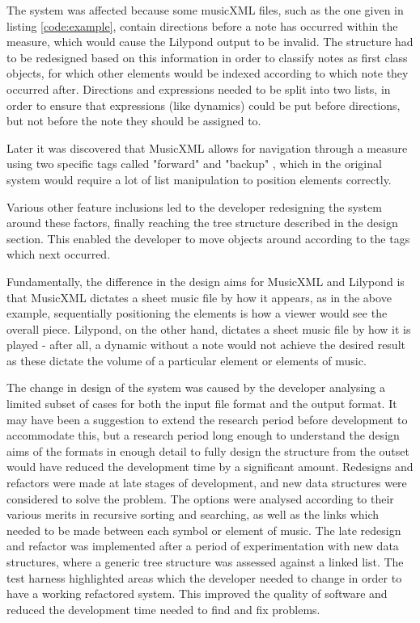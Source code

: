 The system was affected because some musicXML files, such as the one given in listing \ref{code:example}, contain directions before a note has occurred within the measure, which would cause the Lilypond output to be invalid. 
 The structure had to be redesigned based on this information in order to classify notes as first class objects, for which other elements would be indexed according to which note they occurred after. Directions and expressions needed to be split into two lists, in order to ensure that expressions (like dynamics) could be put before directions, but not before the note they should be assigned to.

Later it was discovered that MusicXML allows for navigation through a measure using two specific tags called "forward" and "backup" \parencite{forward}, which in the original system would require a lot of list manipulation to position elements correctly. 

Various other feature inclusions led to the developer redesigning the system around these factors, finally reaching the tree structure described in the design section. This enabled the developer to move objects around according to the tags which next occurred.

Fundamentally, the difference in the design aims for MusicXML and Lilypond is that MusicXML dictates a sheet music file by how it appears, as in the above example, sequentially positioning the elements is how a viewer would see the overall piece. Lilypond, on the other hand, dictates a sheet music file by how it is played - after all, a dynamic without a note would not achieve the desired result as these dictate the volume of a particular element or elements of music. 

 The change in design of the system was caused by the developer analysing a limited subset of cases for both the input file format and the output format. It may have been a suggestion to extend the research period before development to accommodate this, but a research period long enough to understand the design aims of the formats in enough detail to fully design the structure from the outset would have reduced the development time by a significant amount. Redesigns and refactors were made at late stages of development, and new data structures were considered to solve the problem. The options were analysed according to their various merits in recursive sorting and searching, as well as the links which needed to be made between each symbol or element of music. The late redesign and refactor was implemented after a period of experimentation with new data structures, where a generic tree structure was assessed against a linked list. The test harness highlighted areas which the developer needed to change in order to have a working refactored system. This improved the quality of software and reduced the development time needed to find and fix problems.
 
